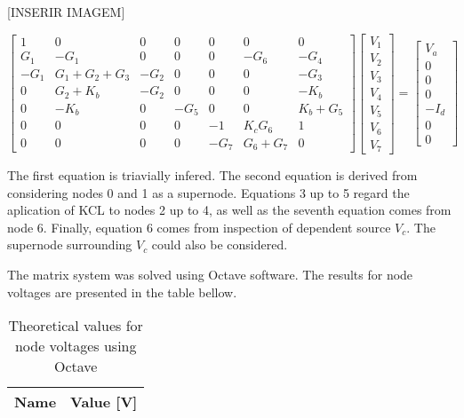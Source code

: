 [INSERIR IMAGEM]

\begin{equation*}
\begin{bmatrix} 
 1 & 0 & 0 & 0 & 0 & 0 & 0 \\
 G_1 & -G_1 & 0 & 0 & 0 & -G_6 & -G_4 \\
 -G_1 & G_1+G_2+G_3 & -G_2 & 0 & 0 & 0 & -G_3\\
 0 & G_2+K_b & -G_2 & 0 & 0 & 0 & -K_b\\
 0 & -K_b & 0 & -G_5 & 0 & 0 & K_b+G_5\\
 0 & 0 & 0 & 0 & -1 & K_cG_6 & 1\\
 0 & 0 & 0 & 0 & -G_7 & G_6+G_7 & 0\end{bmatrix} 
\begin{bmatrix} 
 V_1\\ V_2\\ V_3\\ V_4\\ V_5\\ V_6\\ V_7\end{bmatrix} 
= 
\begin{bmatrix} 
 V_a\\ 0\\ 0\\ 0\\ -I_d\\ 0\\ 0 \end{bmatrix}
\end{equation*}

\par The first equation is triavially infered. The second equation is derived from considering nodes 0 and 1 as a supernode. Equations 3 up to 5 regard the aplication of KCL to nodes 2 up to 4, as well as the seventh equation comes from node 6. Finally, equation 6 comes from inspection of dependent source $V_c$. The supernode surrounding $V_c$ could also be considered.

\par The matrix system was solved using Octave software. The results for node voltages are presented in the table bellow.


\begin{table}[H]
  \centering
  \begin{tabular}{|l|r|}
    \hline
    {\bf Name} & {\bf Value [V]} \\ \hline
    
  \end{tabular}
  \caption{Theoretical values for node voltages using Octave}
  \label{tab:TVoltages}
\end{table}

